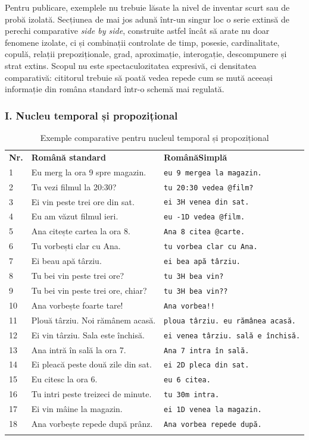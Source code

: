 \documentclass[12pt,onecolumn,letterpaper]{article}
\newcommand{\rs}[1]{\texttt{#1}}
\newcommand{\RStablelayout}{%
\footnotesize
\setlength{\tabcolsep}{6pt}%
\renewcommand{\arraystretch}{1.12}%
\arrayrulecolor{RSRule}%
}
\begin{document}
Pentru publicare, exemplele nu trebuie lăsate la nivel de inventar scurt sau de
probă izolată.
Secțiunea de mai jos adună într-un singur loc o serie extinsă de perechi
comparative \textit{side by side}, construite astfel încât să arate nu doar
fenomene izolate, ci și combinații controlate de timp, posesie, cardinalitate,
copulă, relații prepoziționale, grad, aproximație, interogație, descompunere și
strat extins. Scopul nu este spectaculozitatea expresivă, ci densitatea
comparativă: cititorul trebuie să poată vedea repede cum se mută aceeași
informație din româna standard într-o schemă mai regulată.

\subsubsection{I. Nucleu temporal și propozițional}

\RStablelayout
\begin{longtable}{@{}p{0.6cm}p{5.4cm}p{5.5cm}@{}}
\rowcolor{RSGray}
\textbf{Nr.} & \textbf{Română standard} & \textbf{RomânăSimplă} \\
1 & Eu merg la ora 9 spre magazin. & \rs{eu 9 mergea la magazin.} \\
2 & Tu vezi filmul la 20:30? & \rs{tu 20:30 vedea @film?} \\
3 & Ei vin peste trei ore din sat. & \rs{ei 3H venea din sat.} \\
4 & Eu am văzut filmul ieri. & \rs{eu -1D vedea @film.} \\
5 & Ana citește cartea la ora 8. & \rs{Ana 8 citea @carte.} \\
6 & Tu vorbești clar cu Ana. & \rs{tu vorbea clar cu Ana.} \\
7 & Ei beau apă târziu. & \rs{ei bea apă târziu.} \\
8 & Tu bei vin peste trei ore? & \rs{tu 3H bea vin?} \\
9 & Tu bei vin peste trei ore, chiar? & \rs{tu 3H bea vin??} \\
10 & Ana vorbește foarte tare! & \rs{Ana vorbea!!} \\
11 & Plouă târziu. Noi rămânem acasă. & \rs{ploua târziu. eu rămânea acasă.} \\
12 & Ei vin târziu. Sala este închisă. & \rs{ei venea târziu. sală e închisă.} \\
13 & Ana intră în sală la ora 7. & \rs{Ana 7 intra în sală.} \\
14 & Ei pleacă peste două zile din sat. & \rs{ei 2D pleca din sat.} \\
15 & Eu citesc la ora 6. & \rs{eu 6 citea.} \\
16 & Tu intri peste treizeci de minute. & \rs{tu 30m intra.} \\
17 & Ei vin mâine la magazin. & \rs{ei 1D venea la magazin.} \\
18 & Ana vorbește repede după prânz. & \rs{Ana vorbea repede după.} \\
\bottomrule
\caption{Exemple comparative pentru nucleul temporal și propozițional}
\end{longtable}
\end{document}
